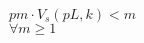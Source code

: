 \documentclass[preview]{standalone}
\begin{document}
\begin{center}
$pm\cdot V_s(pL,k)<m$ \\ $\forall m \ge 1$
\end{center}
\end{document}
